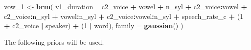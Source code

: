\documentclass[11pt,]{article}
\newenvironment{Shaded}{\begin{snugshade}}{\end{snugshade}}
\newcommand{\KeywordTok}[1]{\textcolor[rgb]{0.13,0.29,0.53}{\textbf{#1}}}
\newcommand{\DataTypeTok}[1]{\textcolor[rgb]{0.13,0.29,0.53}{#1}}
\newcommand{\DecValTok}[1]{\textcolor[rgb]{0.00,0.00,0.81}{#1}}
\newcommand{\StringTok}[1]{\textcolor[rgb]{0.31,0.60,0.02}{#1}}
\newcommand{\OperatorTok}[1]{\textcolor[rgb]{0.81,0.36,0.00}{\textbf{#1}}}
\newcommand{\NormalTok}[1]{#1}
\begin{document}
\begin{Shaded}
\begin{Highlighting}[]
\NormalTok{vow_}\DecValTok{1}\NormalTok{ <-}\StringTok{ }\KeywordTok{brm}\NormalTok{(}
\NormalTok{  v1_duration }\OperatorTok{~}
\StringTok{    }\NormalTok{c2_voice }\OperatorTok{+}
\StringTok{    }\NormalTok{vowel }\OperatorTok{+}
\StringTok{    }\NormalTok{n_syl }\OperatorTok{+}
\StringTok{    }\NormalTok{c2_voice}\OperatorTok{:}\NormalTok{vowel }\OperatorTok{+}
\StringTok{    }\NormalTok{c2_voice}\OperatorTok{:}\NormalTok{n_syl }\OperatorTok{+}
\StringTok{    }\NormalTok{vowel}\OperatorTok{:}\NormalTok{n_syl }\OperatorTok{+}
\StringTok{    }\NormalTok{c2_voice}\OperatorTok{:}\NormalTok{vowel}\OperatorTok{:}\NormalTok{n_syl }\OperatorTok{+}
\StringTok{    }\NormalTok{speech_rate_c }\OperatorTok{+}
\StringTok{    }\NormalTok{(}\DecValTok{1} \OperatorTok{+}\StringTok{ }\NormalTok{c2_voice }\OperatorTok{|}\StringTok{ }\NormalTok{speaker) }\OperatorTok{+}
\StringTok{    }\NormalTok{(}\DecValTok{1} \OperatorTok{|}\StringTok{ }\NormalTok{word),}
  \DataTypeTok{family =} \KeywordTok{gaussian}\NormalTok{()}
\NormalTok{)}
\end{Highlighting}
\end{Shaded}

The following priors will be used.
\end{document}
